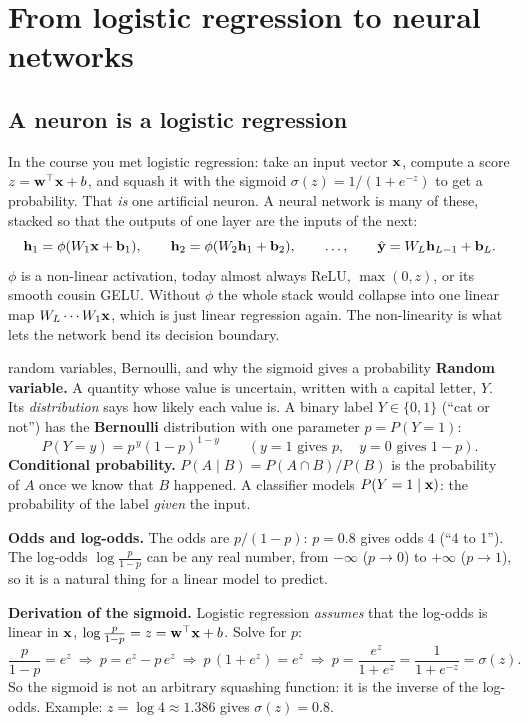 \section{From logistic regression to neural networks}

\subsection{A neuron is a logistic regression}
In the course you met logistic regression: take an input vector $\mathbf{x}$, compute a score $z=\mathbf{w}^\top\mathbf{x}+b$, and squash it with the sigmoid $\sigma(z)=1/(1+e^{-z})$ to get a probability. That \emph{is} one artificial neuron. A neural network is many of these, stacked so that the outputs of one layer are the inputs of the next:
\begin{equation}
\mathbf{h}_1=\phi(W_1\mathbf{x}+\mathbf{b}_1),\qquad \mathbf{h}_2=\phi(W_2\mathbf{h}_1+\mathbf{b}_2),\qquad \dots,\qquad \hat{\mathbf{y}}=W_L\mathbf{h}_{L-1}+\mathbf{b}_L .
\label{eq:mlp}
\end{equation}
$\phi$ is a non-linear activation, today almost always ReLU, $\max(0,z)$, or its smooth cousin GELU. Without $\phi$ the whole stack would collapse into one linear map $W_L\cdots W_1\mathbf{x}$, which is just linear regression again. The non-linearity is what lets the network bend its decision boundary.

\begin{probbox}{random variables, Bernoulli, and why the sigmoid gives a probability}
\textbf{Random variable.} A quantity whose value is uncertain, written with a capital letter, $Y$. Its \emph{distribution} says how likely each value is. A binary label $Y\in\{0,1\}$ (``cat or not'') has the \textbf{Bernoulli} distribution with one parameter $p=P(Y=1)$:
\[
P(Y=y)=p^{\,y}(1-p)^{1-y}\qquad(y=1\text{ gives }p,\quad y=0\text{ gives }1-p).
\]
\textbf{Conditional probability.} $P(A\mid B)=P(A\cap B)/P(B)$ is the probability of $A$ once we know that $B$ happened. A classifier models $P(Y=1\mid\mathbf{x})$: the probability of the label \emph{given} the input.

\textbf{Odds and log-odds.} The odds are $p/(1-p)$: $p=0.8$ gives odds $4$ (``4 to 1''). The log-odds $\log\frac{p}{1-p}$ can be any real number, from $-\infty$ ($p\to0$) to $+\infty$ ($p\to1$), so it is a natural thing for a linear model to predict.

\textbf{Derivation of the sigmoid.} Logistic regression \emph{assumes} that the log-odds is linear in $\mathbf{x}$, $\log\frac{p}{1-p}=z=\mathbf{w}^\top\mathbf{x}+b$. Solve for $p$:
\[
\frac{p}{1-p}=e^{z}\ \Rightarrow\ p=e^{z}-p\,e^{z}\ \Rightarrow\ p\,(1+e^{z})=e^{z}\ \Rightarrow\ p=\frac{e^{z}}{1+e^{z}}=\frac{1}{1+e^{-z}}=\sigma(z).
\]
So the sigmoid is not an arbitrary squashing function: it is the inverse of the log-odds. Example: $z=\log 4\approx1.386$ gives $\sigma(z)=0.8$.
\end{probbox}

